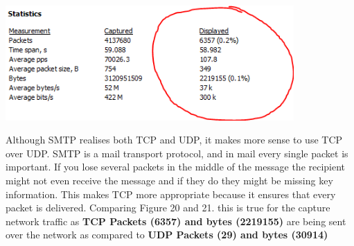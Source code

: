 \documentclass[a4paper,11pt]{article}
\begin{document}
\begin{enumerate}
\begin{minipage}{5in}
		\captionsetup{justification=centering}
		\includegraphics[width = 11cm]{tcpsmtp}
		\captionsetup{justification=centering}
	\end{minipage}
	\newline\newline
Although SMTP realises both TCP and UDP, it makes more sense to use TCP over UDP. SMTP is a mail transport protocol, and in mail every single packet is important. If you lose several packets in the middle of the message the recipient might not even receive the message and if they do they might be missing key information. This makes TCP more appropriate because it ensures that every packet is delivered. Comparing Figure 20 and 21. this is true for the capture network traffic as \textbf{TCP Packets (6357) and bytes (2219155)} are being sent over the network as compared to \textbf{UDP Packets (29) and bytes (30914)}
\end{enumerate}
\pagebreak
\end{document}
